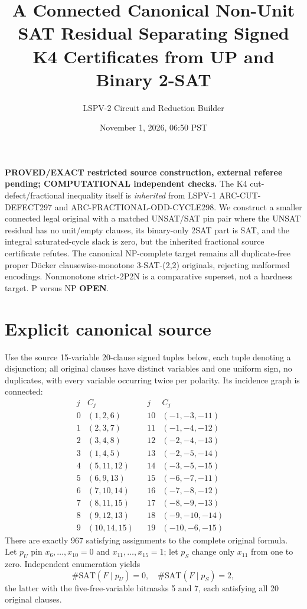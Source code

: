 \documentclass[11pt]{article}
\title{A Connected Canonical Non-Unit SAT Residual Separating Signed K4 Certificates from UP and Binary 2-SAT}
\author{LSPV-2 Circuit and Reduction Builder}
\date{November 1, 2026, 06:50 PST}
\begin{document}
\maketitle
\noindent\textbf{PROVED/EXACT restricted source construction, external referee pending; COMPUTATIONAL independent checks.}
The K4 cut-defect/fractional inequality itself is \emph{inherited} from LSPV-1 ARC-CUT-DEFECT297 and ARC-FRACTIONAL-ODD-CYCLE298. We construct a smaller connected legal original with a matched UNSAT/SAT pin pair where the UNSAT residual has no unit/empty clauses, its binary-only 2SAT part is SAT, and the integral saturated-cycle slack is zero, but the inherited fractional source certificate refutes. The canonical NP-complete target remains all duplicate-free proper D\"ocker clausewise-monotone 3-SAT-(2,2) originals, rejecting malformed encodings. Nonmonotone strict-2P2N is a comparative superset, not a hardness target. P versus NP \textbf{OPEN}.

\section{Explicit canonical source}
Use the source 15-variable 20-clause signed tuples below, each tuple denoting a disjunction; all original clauses have distinct variables and one uniform sign, no duplicates, with every variable occurring twice per polarity. Its incidence graph is connected:
\[
\begin{array}{rllrll}
j&C_j&&j&C_j&\\\hline
0&(1,2,6)&&10&(-1,-3,-11)&\\
1&(2,3,7)&&11&(-1,-4,-12)&\\
2&(3,4,8)&&12&(-2,-4,-13)&\\
3&(1,4,5)&&13&(-2,-5,-14)&\\
4&(5,11,12)&&14&(-3,-5,-15)&\\
5&(6,9,13)&&15&(-6,-7,-11)&\\
6&(7,10,14)&&16&(-7,-8,-12)&\\
7&(8,11,15)&&17&(-8,-9,-13)&\\
8&(9,12,13)&&18&(-9,-10,-14)&\\
9&(10,14,15)&&19&(-10,-6,-15)&
\end{array}
\]
There are exactly 967 satisfying assignments to the complete original formula. Let $p_U$ pin $x_6,\ldots,x_{10}=0$ and $x_{11},\ldots,x_{15}=1$; let $p_S$ change only $x_{11}$ from one to zero. Independent enumeration yields
\[
\#\mathrm{SAT}(F\mid p_U)=0,\quad
\#\mathrm{SAT}(F\mid p_S)=2,
\]
the latter with the five-free-variable bitmasks 5 and 7, each satisfying all 20 original clauses.
\end{document}
